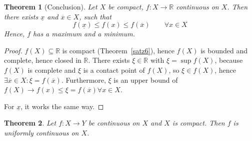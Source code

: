 \documentclass{article}
\newtheorem{theorem}{Theorem}  \numberwithin{theorem}{section}
\begin{document}
\begin{theorem}[Conclusion] %
  \label{satz7}
  Let $X$ be compact, $f: X \to \mathbb R$ continuous on $X$.
  Then there exists $\underline{x}$ and $\overline{x} \in X$, such that
  \[ f(\underline{x}) \leq f(x) \leq f(\overline{x}) \qquad \forall x \in X \]
  Hence, $f$ has a maximum and a minimum.
\end{theorem}

\begin{proof}
  $f(X) \subseteq \mathbb R$ is compact (Theorem~\ref{satz6}), hence $f(X)$ is bounded and complete, hence closed in $\mathbb R$.
  There exists $\xi \in \mathbb R$ with $\xi = \sup{f(X)}$, because $f(X)$ is complete and $\xi$ is a contact point of $f(X)$, so $\xi \in f(X)$, hence $\exists \overline{x} \in X: \xi = f(\overline{x})$. Furthermore, $\xi$ is an upper bound of $f(X) \to f(x) \leq \xi = f(\overline{x}) \forall x \in X$.

  For $\underline{x}$, it works the same way.
\end{proof}

\begin{theorem} %
  \label{satz8}
  Let $f: X \to Y$ be continuous on $X$ and $X$ is compact. Then $f$ is uniformly continuous on $X$.
\end{theorem}
\end{document}
